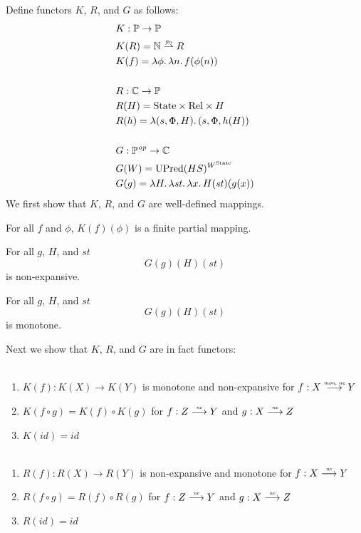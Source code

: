 \documentclass{article}
\newcommand{\forcenewline}{$\phantom{v}$\\}
\newcommand{\finparfun}{\stackrel{\textit{\tiny{fin}}}{\rightharpoonup}}
\newcommand{\monnefun}{\stackrel{\textit{\tiny{mon, ne}}}{\longrightarrow}}
\newcommand{\nefun}{\stackrel{\textit{\tiny{ne}}}{\longrightarrow}}
\newcommand{\id}{\var{id}}
\newcommand{\CatC}{\mathbb{C}}
\newcommand{\CatP}{\mathbb{P}}
\newcommand{\var}[1]{\mathit{#1}}
\newcommand{\plaindom}[1]{\mathrm{#1}}
\newcommand{\nats}{\mathbb{N}}
\newcommand{\Rel}{\plaindom{Rel}}
\newcommand{\States}{\plaindom{State}}
\newcommand{\UPred}[1]{\plaindom{UPred}(#1)}
\begin{document}
Define functors $K$, $R$, and $G$ as follows:
\begin{align*}
  & K : \CatP \rightarrow \CatP \\
  & K(R) = \nats \finparfun R \\
  & K(f) = \lambda \phi \ldotp \lambda n \ldotp f(\phi(n)) \\
  & \\
  & R : \CatC \rightarrow \CatP \\
  & R(H) = \States \times \Rel \times H\\
  & R(h) = \lambda (s,\Phi,H) \ldotp (s,\Phi,h(H))\\
  & \\
  & G : \CatP^{\var{op}} \rightarrow \CatC \\
  & G(W) = \UPred{HS}^{W^{\States}} \\
  & G(g) = \lambda H \ldotp \lambda \var{st} \ldotp \lambda x \ldotp H (\var{st})(g(x))
\end{align*}
We first show that $K$, $R$, and $G$ are well-defined mappings.
\begin{lemma}
  \label{lem:world-finpar}
  For all $f$ and $\phi$, $K(f)(\phi)$ is a finite partial mapping.
\end{lemma}
\begin{lemma}
\label{lem:HSP-mon}
For all $g$, $H$, and $\var{st}$
\[
G(g) (H) (\var{st})
\]
is non-expansive.
\end{lemma}
\begin{lemma}
\label{lem:HSP-ne}
For all $g$, $H$, and $\var{st}$
\[
G(g) (H) (\var{st})
\]
is monotone.
\end{lemma}
Next we show that $K$, $R$, and $G$ are in fact functors:
\begin{lemma}[$K$ functorial]\forcenewline
\label{lem:K-func}
  \begin{enumerate}
  \item $K(f) : K(X) \rightarrow K(Y)$ is monotone and non-expansive for $f : X \monnefun Y$
  \item $K(f \circ g) = K(f) \circ K(g)$ for $f : Z \nefun Y$ and $g : X \nefun Z$
  \item $K(\id) = \id$
  \end{enumerate}
\end{lemma}

\begin{lemma}[$R$ functorial]\forcenewline
\label{lem:R-func}
  \begin{enumerate}
  \item $R(f) : R(X) \rightarrow R(Y)$ is non-expansive and monotone for $f : X \nefun Y$
  \item $R(f \circ g) = R(f) \circ R(g)$ for $f : Z \nefun Y$ and $g : X \nefun Z$
  \item $R(\id) = \id$
  \end{enumerate}
\end{lemma}
\end{document}
